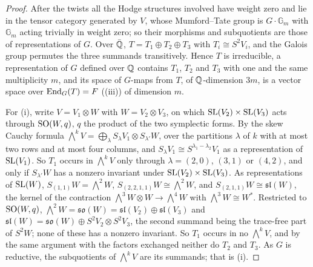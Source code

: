 \begin{proof}
After the twists all the Hodge structures involved have weight zero and lie in
the tensor category generated by $V$, whose Mumford--Tate group is
$G\cdot\mathbb{G}_{m}$ with $\mathbb{G}_{m}$ acting trivially in weight zero;
so their morphisms and subquotients are those of representations of $G$.
Over $\bar{\mathbb{Q}}$, $T=T_{1}\oplus T_{2}\oplus T_{3}$ with $T_{i}\cong S^{2}V_{i}$,
and the Galois group permutes the three summands transitively. Hence $T$ is
irreducible, a representation of $G$ defined over $\mathbb{Q}$ contains
$T_{1}$, $T_{2}$ and $T_{3}$ with one and the same multiplicity $m$, and its
space of $G$-maps from $T$, of $\mathbb{Q}$-dimension $3m$, is a vector space over
$\operatorname{End}_{G}(T)=F$ ((iii)) of dimension $m$.

For (i), write $V=V_{1}\otimes W$ with $W=V_{2}\otimes V_{3}$, on which
$\operatorname{SL}(V_{2})\times\operatorname{SL}(V_{3})$ acts through $\operatorname{SO}(W,q)$, $q$ the product of the
two symplectic forms. By the skew Cauchy formula
$\bigwedge^{k}V=\bigoplus_{\lambda}S_{\lambda}V_{1}\otimes S_{\lambda'}W$,
over the partitions $\lambda$ of $k$ with at most two rows and at most four
columns, and $S_{\lambda}V_{1}\cong S^{\lambda_{1}-\lambda_{2}}V_{1}$ as a
representation of $\operatorname{SL}(V_{1})$. So $T_{1}$ occurs in $\bigwedge^{k}V$ only
through $\lambda=(2,0)$, $(3,1)$ or $(4,2)$, and only if $S_{\lambda'}W$ has a
nonzero invariant under $\operatorname{SL}(V_{2})\times\operatorname{SL}(V_{3})$. As representations of
$\operatorname{SL}(W)$, $S_{(1,1)}W=\bigwedge^{2}W$, $S_{(2,2,1,1)}W\cong\bigwedge^{2}W$, and
$S_{(2,1,1)}W\cong\mathfrak{sl}(W)$, the kernel of the contraction
$\bigwedge^{3}W\otimes W\to\bigwedge^{4}W$ with $\bigwedge^{3}W\cong W^{*}$.
Restricted to $\operatorname{SO}(W,q)$, $\bigwedge^{2}W=\mathfrak{so}(W)=
\mathfrak{sl}(V_{2})\oplus\mathfrak{sl}(V_{3})$ and
$\mathfrak{sl}(W)=\mathfrak{so}(W)\oplus S^{2}V_{2}\otimes S^{2}V_{3}$, the
second summand being the trace-free part of $S^{2}W$; none of these has a
nonzero invariant. So $T_{1}$ occurs in no $\bigwedge^{k}V$, and by the same
argument with the factors exchanged neither do $T_{2}$ and $T_{3}$. As $G$ is
reductive, the subquotients of $\bigwedge^{k}V$ are its summands; that is (i).


\end{proof}
